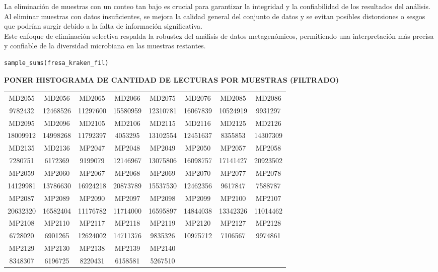 La eliminación de muestras con un conteo tan bajo es crucial para garantizar la integridad y la confiabilidad de los resultados del análisis. Al eliminar muestras con datos insuficientes, se mejora la calidad general del conjunto de datos y se evitan posibles distorsiones o sesgos que podrían surgir debido a la falta de información significativa.\\

Este enfoque de eliminación selectiva respalda la robustez del análisis de datos metagenómicos, permitiendo una interpretación más precisa y confiable de la diversidad microbiana en las muestras restantes.\\

\begin{lstlisting}[basicstyle=\small] 
sample_sums(fresa_kraken_fil)
\end{lstlisting}

\textbf{PONER HISTOGRAMA DE CANTIDAD DE LECTURAS POR MUESTRAS (FILTRADO)}

\resizebox{0.9\textwidth}{!} {
\begin{tabular}{ c c c c c c c c }
MD2055 & MD2056 & MD2065 & MD2066 & MD2075 & MD2076 & MD2085 & MD2086 \\
9782432 & 12468526 & 11297600 & 15580959 & 12310781 & 16067839 & 10524919 & 9931297 \\
MD2095 & MD2096 & MD2105 & MD2106 & MD2115 & MD2116 & MD2125 & MD2126 \\
18009912 & 14998268 & 11792397 & 4053295 & 13102554 & 12451637 & 8355853 & 14307309 \\
MD2135 & MD2136 & MP2047 & MP2048 & MP2049 & MP2050 & MP2057 & MP2058 \\
7280751 & 6172369 & 9199079 & 12146967 & 13075806 & 16098757 & 17141427 & 20923502 \\
MP2059 & MP2060 & MP2067 & MP2068 & MP2069 & MP2070 & MP2077 & MP2078 \\
14129981 & 13786630 & 16924218 & 20873789 & 15537530 & 12462356 & 9617847 & 7588787 \\
MP2087 & MP2089 & MP2090 & MP2097 & MP2098 & MP2099 & MP2100 & MP2107 \\
20632320 & 16582404 & 11176782 & 11714000 & 16595897 & 14844038 & 13342326 & 11014462 \\
MP2108 & MP2110 & MP2117 & MP2118 & MP2119 & MP2120 & MP2127 & MP2128 \\
6728020 & 6901265 & 12624002 & 14711376 & 9835326 & 10975712 & 7106567 & 9974861 \\
MP2129 & MP2130 & MP2138 & MP2139 & MP2140 \\
8348307 & 6196725 & 8220431 & 6158581 & 5267510
\end{tabular}
}

